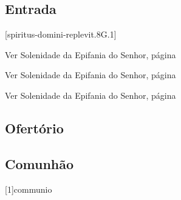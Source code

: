
\subsection{Entrada}\label{subsection:tempus-nativitatis/in-baptismate-domini/introitus}
[spiritus-domini-replevit.8G.1]

\AllowPageFlush

\begin{rubrica}
  Ver Solenidade da Epifania do Senhor, página~\pageref{subsection:tempus-nativitatis/in-epiphania-domini/psalmus-responsorius}
\end{rubrica}

\begin{rubrica}
  Ver Solenidade da Epifania do Senhor, página~\pageref{subsection:tempus-nativitatis/in-epiphania-domini/alleluia}
\end{rubrica}

\begin{rubrica}
  Ver Solenidade da Epifania do Senhor, página~\pageref{subsection:tempus-nativitatis/in-epiphania-domini/psalmus-alleluiaticus}
\end{rubrica}

\subsection{Ofertório}\label{subsection:tempus-nativitatis/in-baptismate-domini/offertorium}

\AllowPageBreak

\subsection{Comunhão}\label{subsection:tempus-nativitatis/in-baptismate-domini/communio}
[1]{communio}